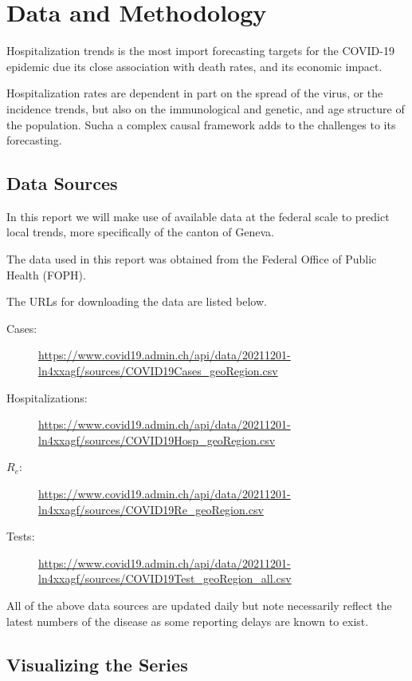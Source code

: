 \documentclass[11pt]{article}
\begin{document}
    \hypertarget{estimating-hospitalization-risk}{%
\section{Data and Methodology}\label{estimating-hospitalization-risk}}

Hospitalization trends is the most import forecasting targets for the COVID-19 epidemic due its close association with death rates, and its economic impact. 

Hospitalization rates are dependent in part on the spread of the virus, or the incidence trends, but also on the immunological and genetic, and age structure of the population. Sucha a complex causal framework adds to the challenges to its forecasting.

    \hypertarget{getting-the-data-from-foph}{%
\subsection{Data Sources}
\label{getting-the-data-from-foph}}

In this report we will make use of available data at the federal scale to predict local trends, more specifically of the canton of Geneva.

The data used in this report was obtained from the Federal Office of Public Health (FOPH). 

The URLs for downloading the data are listed below.

\begin{description}
 \item [Cases:] \url{https://www.covid19.admin.ch/api/data/20211201-ln4xxagf/sources/COVID19Cases_geoRegion.csv}
 \item [Hospitalizations:] \url{https://www.covid19.admin.ch/api/data/20211201-ln4xxagf/sources/COVID19Hosp_geoRegion.csv}
 \item [$R_e$:] \url{https://www.covid19.admin.ch/api/data/20211201-ln4xxagf/sources/COVID19Re_geoRegion.csv}
 \item [Tests:] \url{https://www.covid19.admin.ch/api/data/20211201-ln4xxagf/sources/COVID19Test_geoRegion_all.csv}
\end{description}

All of the above data sources are updated daily but note necessarily reflect the latest numbers of the disease as some reporting delays are known to exist.
    
    
    \hypertarget{visualizing-the-series}{%
\subsection{Visualizing the Series}\label{visualizing-the-series}}
\end{document}
